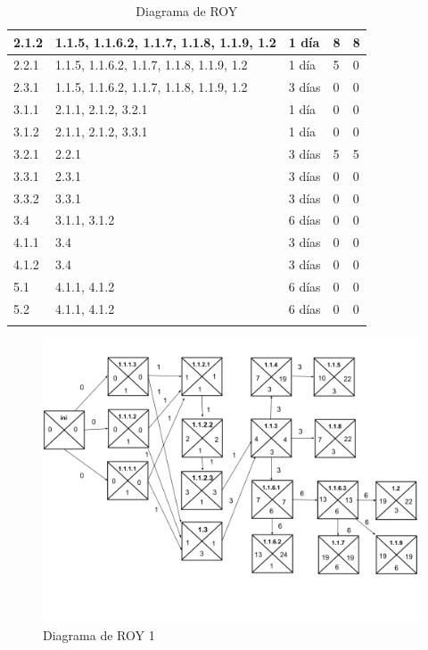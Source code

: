 \documentclass{report}
\begin{document}
\begin{longtable}{|p{3cm}|p{3cm}|p{3cm}|p{3cm}|p{3cm}|}
                \hline
                2.1.2 & 1.1.5, 1.1.6.2, 1.1.7, 1.1.8, 1.1.9, 1.2 & 1 día & 8 & 8\\
                \hline
                2.2.1 & 1.1.5, 1.1.6.2, 1.1.7, 1.1.8, 1.1.9, 1.2 & 1 día & 5 & 0\\
                \hline
                2.3.1 & 1.1.5, 1.1.6.2, 1.1.7, 1.1.8, 1.1.9, 1.2 & 3 días & 0 & 0\\
                \hline
                3.1.1 & 2.1.1, 2.1.2, 3.2.1 & 1 día & 0 & 0\\
                \hline
                3.1.2 & 2.1.1, 2.1.2, 3.3.1 & 1 día & 0 & 0\\
                \hline
                3.2.1 & 2.2.1 & 3 días & 5 & 5\\
                \hline
                3.3.1 & 2.3.1 & 3 días & 0 & 0\\
                \hline
                3.3.2 & 3.3.1 & 3 días & 0 & 0\\
                \hline
                3.4 & 3.1.1, 3.1.2 & 6 días & 0 & 0\\
                \hline
                4.1.1 & 3.4 & 3 días & 0 & 0\\
                \hline
                4.1.2 & 3.4 & 3 días & 0 & 0\\
                \hline
                5.1 & 4.1.1, 4.1.2 & 6 días & 0 & 0\\
                \hline
                5.2 & 4.1.1, 4.1.2 & 6 días & 0 & 0\\
                \hline
                \caption{Diagrama de ROY}
            \end{longtable}
            \begin{figure}[H]
                \centering
                \includegraphics[width=1\textwidth]{./img/roy1.png}
                \caption{Diagrama de ROY 1}
            \end{figure}
\end{document}
